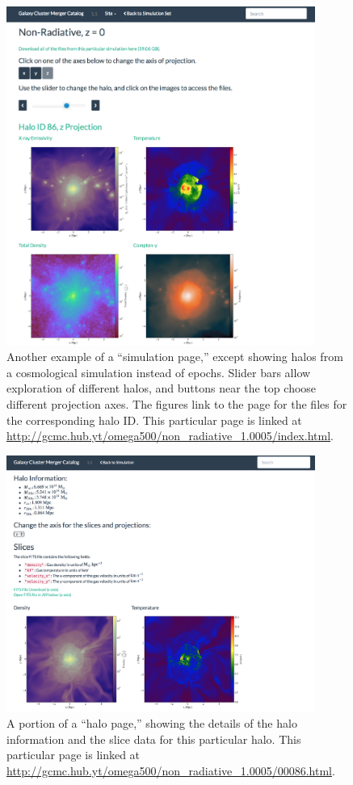 \documentclass{emulateapj}
\begin{document}
\begin{figure}
\begin{center}
\includegraphics[width=0.9\textwidth]{halos_page.eps}
\caption{Another example of a ``simulation page,'' except showing halos from a cosmological simulation instead of epochs. Slider bars allow exploration of different halos, and buttons near the top choose different projection axes. The figures link to the page for the files for the corresponding halo ID. This particular page is linked at \url{http://gcmc.hub.yt/omega500/non_radiative_1.0005/index.html}.}
\end{center}
\end{figure}

\begin{figure}
\begin{center}
\includegraphics[width=0.9\textwidth]{halo_page.eps}
\caption{A portion of a ``halo page,'' showing the details of the halo information and the slice data for this particular halo. This particular page is linked at \url{http://gcmc.hub.yt/omega500/non_radiative_1.0005/00086.html}.}
\end{center}
\end{figure}
\end{document}
